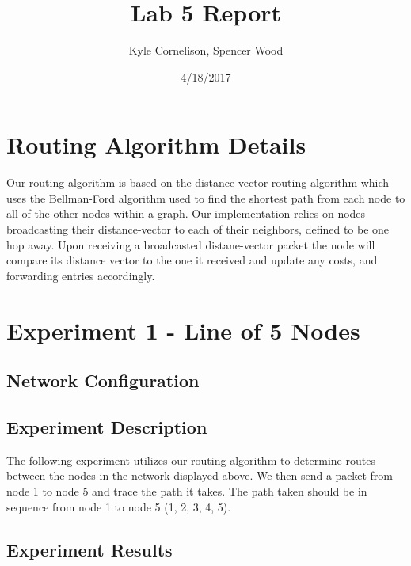 \documentclass[fleqn,11pt]{article}
\begin{document}
\lstset{
  language=Python,
  basicstyle=\small,          %
  keywordstyle=\bfseries,
  identifierstyle=,           %
  commentstyle=,              %
  stringstyle=\ttfamily,      %
  showstringspaces=false,     %
  numbers=left,
  numberstyle=\tiny,
  numbersep=5pt,
  frame=tb,
}

\title{Lab 5 Report}

\author{Kyle Cornelison, Spencer Wood}

\date{4/18/2017}

\maketitle

\section{Routing Algorithm Details}
  Our routing algorithm is based on the distance-vector routing algorithm which
  uses the Bellman-Ford algorithm used to find the shortest path from each node
  to all of the other nodes within a graph. Our implementation relies on nodes
  broadcasting their distance-vector to each of their neighbors, defined to be
  one hop away. Upon receiving a broadcasted distane-vector packet the node will
  compare its distance vector to the one it received and update any costs, and
  forwarding entries accordingly.

\section{Experiment 1 - Line of 5 Nodes}
  \subsection{Network Configuration}
    
  \subsection{Experiment Description}
    The following experiment utilizes our routing algorithm to determine routes
    between the nodes in the network displayed above. We then send a packet
    from node 1 to node 5 and trace the path it takes. The path taken should be
    in sequence from node 1 to node 5 (1, 2, 3, 4, 5).

  \subsection{Experiment Results}
\end{document}
